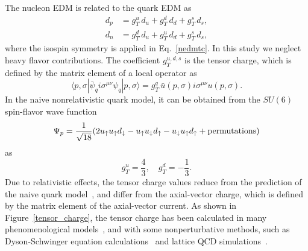 \documentclass[aps,prd,twocolumn,groupedaddress,showpacs,superscriptaddress,floatfix,nofootinbib,10pt]{revtex4-1}
\begin{document}
The nucleon EDM is related to the quark EDM as~\cite{Ellis:1996dg,Bhattacharya:2012bf,Pitschmann:2014jxa}
\begin{align}
d_p&=g_T^u\,d_u+g_T^d\,d_d+g_T^s\,d_s,\label{pedmtc}\\
d_n&=g_T^d\,d_u+g_T^u\,d_d+g_T^s\,d_s,\label{nedmtc}
\end{align}
where the isospin symmetry is applied in Eq.~\eqref{nedmtc}. In this study we neglect heavy flavor contributions. The coefficient $g_T^{u,d,s}$ is the tensor charge, which is defined by the matrix element of a local operator as
\begin{equation}
\langle p,\sigma|\bar{\psi}_q i\sigma^{\mu\nu}\psi_q|p,\sigma\rangle=g_T^{q}\,\bar{u}(p,\sigma)i\sigma^{\mu\nu}u(p,\sigma).
\end{equation}
In the naive nonrelativistic quark model, it can be obtained from the $SU(6)$ spin-flavor wave function~\cite{Gursey:1992dc}
\begin{equation}
\Psi_p=\frac{1}{\sqrt{18}}(2u_\uparrow u_\uparrow d_\downarrow - u_\uparrow u_\downarrow d_\uparrow - u_\downarrow u_\uparrow d_\uparrow + {\rm permutations})
\end{equation}
as
\begin{equation}
g_T^{u}=\frac{4}{3},\quad g_T^{d}=-\frac{1}{3}.
\end{equation}
Due to relativistic effects, the tensor charge values reduce from the prediction of the naive quark model~\cite{Ma:1997gy}, and differ from the axial-vector charge, which is defined by the matrix element of the axial-vector current. As shown in Figure~\ref{tensor_charge}, the tensor charge has been calculated in many phenomenological models~\cite{Cloet:2007em,Wakamatsu:2007nc,Pasquini:2005dk,Gamberg:2001qc,Schweitzer:2001sr,Ma:1997pm,Barone:1996un,Schmidt:1997vm,He:1996wy,Kim:1996vk}, and with some nonperturbative methods, such as Dyson-Schwinger equation calculations~\cite{Pitschmann:2014jxa,Yamanaka:2013zoa} and lattice QCD simulations~\cite{Bhattacharya:2016zcn,Abdel-Rehim:2015owa,Gockeler:2005cj,Bali:2014nma,Green:2012ej,Aoki:2010xg}.
\end{document}
